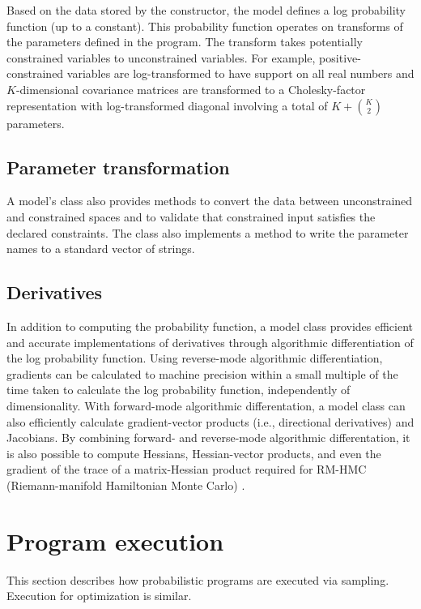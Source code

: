 \documentclass[article]{jss}
\begin{document}
Based on the data stored by the constructor, the model defines a log
probability function (up to a constant).  This probability function
operates on transforms of the parameters defined in the program.  The
transform takes potentially constrained variables to unconstrained
variables.  For example, positive-constrained variables are
log-transformed to have support on all real numbers and
$K$-dimensional covariance matrices are transformed to a
Cholesky-factor representation with log-transformed diagonal involving
a total of $K + {K \choose 2}$ parameters.

\subsection{Parameter transformation}

A model's class also provides methods to convert the data between
unconstrained and constrained spaces and to validate that constrained
input satisfies the declared constraints.  The class also implements a
method to write the parameter names to a standard vector of strings.

\subsection{Derivatives}

In addition to computing the probability function, a model class
provides efficient and accurate implementations of derivatives through
algorithmic differentiation of the log probability function.  Using
reverse-mode algorithmic differentiation, gradients can be calculated
to machine precision within a small multiple of the time taken to
calculate the log probability function, independently of
dimensionality.  With forward-mode algorithmic differentation, a model
class can also efficiently calculate gradient-vector products (i.e.,
directional derivatives) and Jacobians. By combining forward- and
reverse-mode algorithmic differentation, it is also possible to
compute Hessians, Hessian-vector products, and even the gradient of
the trace of a matrix-Hessian product required for RM-HMC
(Riemann-manifold Hamiltonian Monte Carlo)
\citep{Betancourt-softabs:??}.


\section[Program execution]{Program execution}

This section describes how  probabilistic programs are
executed via sampling.  Execution for optimization is similar.  
\end{document}
